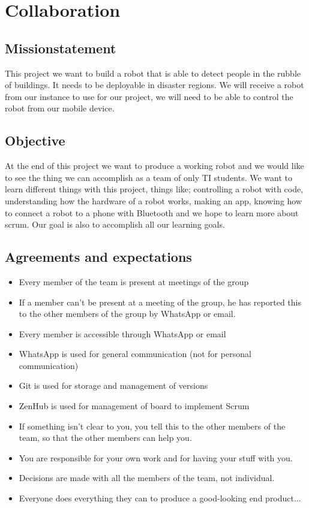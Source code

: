 \section{Collaboration}

\subsection{Missionstatement}
This project we want to build a robot that is able to detect people in the rubble of buildings. It needs to be deployable in disaster regions. We will receive a robot from our instance to use for our project, we will need to be able to control the robot from our mobile device.

\subsection{Objective}
At the end of this project we want to produce a working robot and we would like to see the thing we can accomplish as a team of only TI students. We want to learn different things with this project, things like; controlling a robot with code, understanding how the hardware of a robot works, making an app, knowing how to connect a robot to a phone with Bluetooth and we hope to learn more about scrum. Our goal is also to accomplish all our learning goals.

\subsection{Agreements and expectations}
\begin{itemize}
	\item Every member of the team is present at meetings of the group
	\item If a member can’t be present at a meeting of the group, he has reported this to the other members of the group by WhatsApp or email.
	\item Every member is accessible through WhatsApp or email
	\item WhatsApp is used for general communication (not for personal communication)
	\item Git is used for storage and management of versions
	\item ZenHub is used for management of board to implement Scrum
	\item If something isn’t clear to you, you tell this to the other members of the team, so that the other members can help you.
	\item You are responsible for your own work and for having your stuff with you.
	\item Decisions are made with all the members of the team, not individual.
	\item Everyone does everything they can to produce a good-looking end product...
\end{itemize}

